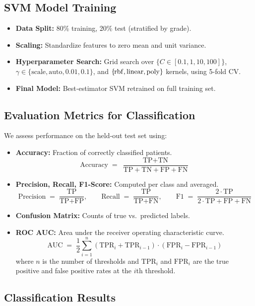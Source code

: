\subsection{SVM Model Training}
\begin{itemize}
  \item \textbf{Data Split:} 80\% training, 20\% test (stratified by grade).
  \item \textbf{Scaling:} Standardize features to zero mean and unit variance.
  \item \textbf{Hyperparameter Search:} Grid search over
        \(\{C \in [0.1,1,10,100]\}\), \(\gamma \in \{\mathrm{scale},\mathrm{auto},0.01,0.1\}\), and \(\{\kern-0.1em\mathrm{rbf},\mathrm{linear},\mathrm{poly}\}\) kernels, using 5-fold CV.
  \item \textbf{Final Model:} Best‐estimator SVM retrained on full training set.
\end{itemize}

\subsection{Evaluation Metrics for Classification}
We assess performance on the held‐out test set using:
\begin{itemize}
  \item \textbf{Accuracy:} Fraction of correctly classified patients.
        \[
          \text{Accuracy} \;=\; \frac{\text{TP} + \text{TN}}{\text{TP} + \text{TN} + \text{FP} + \text{FN}}
        \]
  \item \textbf{Precision, Recall, F1-Score:} Computed per class and averaged.
        \[
          \text{Precision} \;=\; \frac{\text{TP}}{\text{TP} + \text{FP}}, \qquad
          \text{Recall} \;=\; \frac{\text{TP}}{\text{TP} + \text{FN}}, \qquad
          \text{F1} \;=\; \frac{2 \cdot \text{TP}}{2 \cdot \text{TP} + \text{FP} + \text{FN}}
        \]
  \item \textbf{Confusion Matrix:} Counts of true vs.\ predicted labels.
  \item \textbf{ROC AUC:} Area under the receiver operating characteristic curve.
        \[
          \text{AUC} \;=\; \frac{1}{2} \sum_{i=1}^{n} (\text{TPR}_{i} + \text{TPR}_{i-1}) \cdot (\text{FPR}_{i} - \text{FPR}_{i-1})
        \]
        where $n$ is the number of thresholds and $\text{TPR}_i$ and $\text{FPR}_i$ are the true positive and false positive rates at the $i$th threshold.
\end{itemize}

\subsection{Classification Results}
\label{sec:classification-results}

